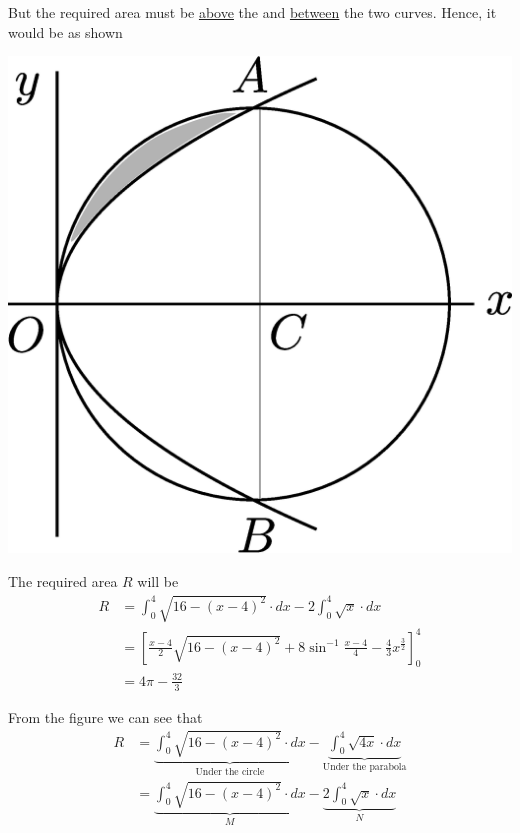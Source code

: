 \documentclass[14pt,fleqn]{extarticle}
\newcommand\expa{16- \left(x-4 \right)^2}
\newcommand\intga{\int_0^4 \sqrt{\expa}\cdot dx}
\newcommand\intgb{2\int_0^4 \sqrt{x}\cdot dx}
\begin{document}
\begin{problem}
\begin{step}
But the required area must be \underline{above} the \xaxis and \underline{between} the two curves. Hence, it would be as shown 

\begin{center}
\includegraphics[scale=0.2]{1381-C.eps}
\end{center}
       
\end{step}

\begin{step}
  \begin{options} 
     \correct 
       
     The required area $R$ will be 
     \smallmath
     \begin{align}
	R &= \intga - \intgb \\
	&= \left[\frac{x-4}{2}\sqrt{\expa} + 8\sin^{-1}\frac{x-4}{4} - \frac{4}{3}x^{\frac{3}{2}}\right]_0^4 \\
	&= 4\pi - \frac{32}{3}
\end{align}

  
    \end{options} 
     \reason 
     
     From the figure we can see that 
     \smallmath\begin{align}
     R &= \underbrace{\intga}_{\text{Under the circle}} - \underbrace{\int_0^4 \sqrt{4x}\cdot dx}_{\text{Under the parabola}} \\
     &= \underbrace{\intga}_M - \underbrace{\intgb}_N
\end{align}


\end{step}
\end{problem}
\end{document}

